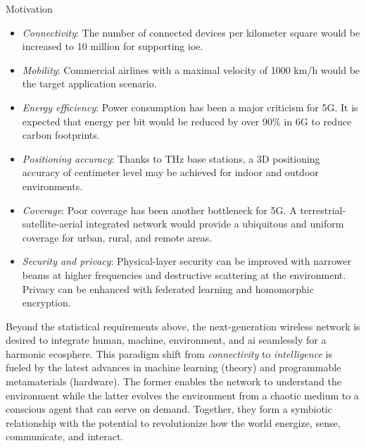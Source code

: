 \begin{section}{Motivation}
\begin{itemize}
		\item \emph{Connectivity}: The number of connected devices per kilometer square would be increased to 10 million for supporting \gls{ioe}.
		\item \emph{Mobility}: Commercial airlines with a maximal velocity of 1000 km/h would be the target application scenario.
		\item \emph{Energy efficiency}: Power consumption has been a major criticism for 5G. It is expected that energy per bit would be reduced by over 90\% in 6G to reduce carbon footprints.
		\item \emph{Positioning accuracy}: Thanks to THz base stations, a 3D positioning accuracy of centimeter level may be achieved for indoor and outdoor environments.
		\item \emph{Coverage}: Poor coverage has been another bottleneck for 5G. A terrestrial-satellite-aerial integrated network would provide a ubiquitous and uniform coverage for urban, rural, and remote areas.
		\item \emph{Security and privacy}: Physical-layer security can be improved with narrower beams at higher frequencies and destructive scattering at the environment. Privacy can be enhanced with federated learning and homomorphic encryption.
	\end{itemize}

	Beyond the statistical requirements above, the next-generation wireless network is desired to integrate human, machine, environment, and \gls{ai} seamlessly for a harmonic ecosphere.
	This paradigm shift from \emph{connectivity} to \emph{intelligence} is fueled by the latest advances in machine learning (theory) and programmable metamaterials (hardware).
	The former enables the network to understand the environment while the latter evolves the environment from a chaotic medium to a conscious agent that can serve on demand.
	Together, they form a symbiotic relationship with the potential to revolutionize how the world energize, sense, communicate, and interact.


\end{section}
